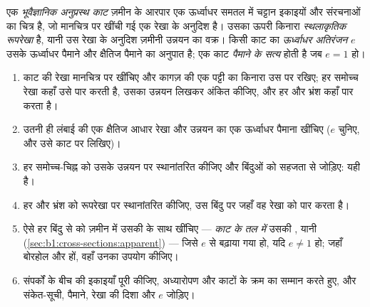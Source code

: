 \begin{definition}[भूवैज्ञानिक अनुप्रस्थ काट, स्थलाकृतिक रूपरेखा, ऊर्ध्वाधर अतिरंजन]\label{def:b1:cross-sections:section}
एक \emph{भूवैज्ञानिक अनुप्रस्थ काट} ज़मीन के आरपार एक ऊर्ध्वाधर समतल में
चट्टान इकाइयों और संरचनाओं का चित्र है, जो मानचित्र पर खींची गई एक रेखा के अनुदिश है। उसका ऊपरी किनारा
\emph{स्थलाकृतिक रूपरेखा} है, यानी उस रेखा के अनुदिश ज़मीनी उन्नयन का वक्र। किसी काट का
\emph{ऊर्ध्वाधर अतिरंजन} $e$ उसके ऊर्ध्वाधर पैमाने और क्षैतिज पैमाने का अनुपात है; एक
काट \emph{पैमाने के सत्य} होती है जब $e = 1$ हो।
\end{definition}

\begin{method}[मानचित्र से अनुप्रस्थ काट बनाना]\label{met:b1:cross-sections:construct}
\begin{enumerate}
  \item काट की रेखा मानचित्र पर खींचिए और कागज़ की एक पट्टी का किनारा उस पर रखिए; हर समोच्च रेखा कहाँ उसे
        पार करती है, उसका उन्नयन लिखकर अंकित कीजिए, और हर  और भ्रंश कहाँ पार करता है।
  \item उतनी ही लंबाई की एक क्षैतिज आधार रेखा और उन्नयन का एक ऊर्ध्वाधर पैमाना खींचिए ($e$ चुनिए, और उसे काट पर लिखिए)।
  \item हर समोच्च-चिह्न को उसके उन्नयन पर स्थानांतरित कीजिए और बिंदुओं को सहजता से जोड़िए: यही  है।
  \item हर  और भ्रंश को रूपरेखा पर स्थानांतरित कीजिए, उस बिंदु पर जहाँ वह रेखा को पार करता है।
  \item ऐसे हर बिंदु से  को ज़मीन में उसकी  के साथ खींचिए --- \emph{काट के तल में} उसकी , यानी  (\cref{sec:b1:cross-sections:apparent}) --- जिसे $e$ से बढ़ाया गया हो, यदि $e \ne 1$ हो; जहाँ बोरहोल और
         हों, वहाँ उनका उपयोग कीजिए।
  \item संपर्कों के बीच की इकाइयाँ पूरी कीजिए, अध्यारोपण और काटों के क्रम का सम्मान करते हुए, और संकेत-सूची, पैमाने,
        रेखा की दिशा और $e$ जोड़िए।
\end{enumerate}
\end{method}

